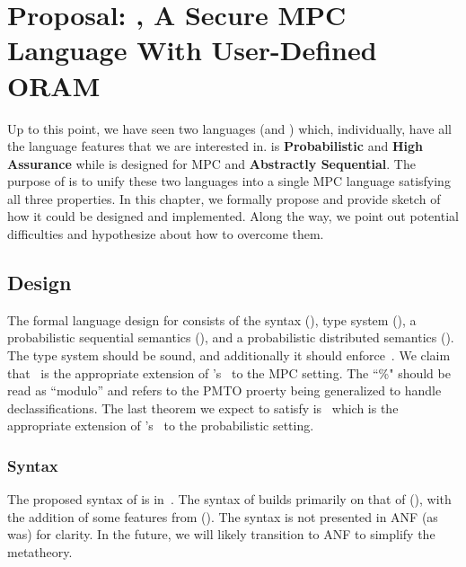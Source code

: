 \chapter{Proposal: \lang, A Secure MPC Language With User-Defined ORAM}
\label{ch:proposal}

Up to this point, we have seen two languages (\mpc and \obliv) which, individually, have all the language
features that we are interested in. \obliv is \textbf{Probabilistic} and \textbf{High Assurance} while \mpc
is designed for MPC and \textbf{Abstractly Sequential}. The purpose of \lang is to unify these two languages
into a single MPC language satisfying all three properties. In this chapter, we formally propose \lang and
provide sketch of how it could be designed and implemented. Along the way, we point out potential difficulties
and hypothesize about how to overcome them.

\section{Design}
\label{sec:proposal-design}

The formal language design for \lang consists of the syntax (), type system (),
a probabilistic sequential semantics (), and a probabilistic distributed semantics ().
The type system should be sound, and additionally it should enforce~. We claim that~
is the appropriate extension of \obliv's~ to the MPC setting. The ``\%" should be read as ``modulo'' and refers
to the PMTO proerty being generalized to handle declassifications. The last theorem we expect \lang to satisfy is~
which is the appropriate extension of \mpc's~ to the probabilistic setting.


\subsection{Syntax}
\label{subsec:proposal-design-syntax}

The proposed syntax of \lang is in~. The syntax of \lang builds primarily
on that of \mpc (), with the addition of some features from \obliv ().
The syntax is not presented in ANF (as \mpc was) for clarity. In the future, we will likely transition
to ANF to simplify the metatheory.

